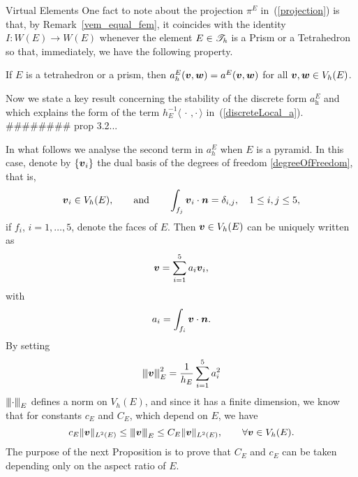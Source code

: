 \begin{chapter}{Virtual Elements}
One fact to note
about the projection $\pi^E$ in~(\ref{projection}) is that, by
Remark~\ref{vem_equal_fem},
it coincides with the identity $I:W(E)\to W(E)$ whenever the element $E\in\mathcal{T}_{\textit{h}}$
is a Prism or a Tetrahedron so that, immediately, we have the following
property.
\begin{remark}\label{ah_equal_a} If $E$ is a tetrahedron or a prism, then
  $a_h^E(\boldsymbol{v},\boldsymbol{w})=a^E(\boldsymbol{v},\boldsymbol{w})$ for all $\boldsymbol{v},\boldsymbol{w} \in V_h(E)$.
\end{remark}
Now we state a key result concerning the stability of the
discrete form $a^E_{\textit{h}}$ and which explains the form of the
term $h_E^{-1}\langle\,\cdot\,,\cdot\,\rangle$ in~(\ref{discreteLocal_a}).
\\{\color{blue}\#\#\#\#\#\#\#\# prop 3.2...}

In what follows we analyse the second term in $a_h^E$ when $E$ is a pyramid.
In this case, denote by $\{\boldsymbol{v}_i\}$ the dual basis of the degrees of freedom \eqref{degreeOfFreedom}, that is,
\[
\boldsymbol{v}_i\in V_h(E), \qquad \mbox{and}\qquad \int_{f_j}\boldsymbol{v}_i\cdot\boldsymbol{n} =\delta_{i,j}, \quad 1\le i,j\le 5,
\]
if $f_i$, $i=1,\ldots,5$, denote the faces of $E$. Then $\boldsymbol{v}\in V_h(E)$ can be uniquely written as
\[
\boldsymbol{v}=\sum_{i=1}^5 a_i \boldsymbol{v}_i,
\]
with
\[
a_i=\int_{f_i}\boldsymbol{v}\cdot\boldsymbol{n}.
\]
By setting
\[
{\left\vert\kern-0.25ex\left\vert\kern-0.25ex\left\vert \boldsymbol{v} \right\vert\kern-0.25ex\right\vert\kern-0.25ex\right\vert}_E^2=\frac1{h_E}\sum_{i=1}^5 a_i^2
\]
${\left\vert\kern-0.25ex\left\vert\kern-0.25ex\left\vert \cdot \right\vert\kern-0.25ex\right\vert\kern-0.25ex\right\vert}_E$ defines a norm on $V_h(E)$, and since it has a finite dimension, we know that for constants $c_E$ and $C_E$, which depend on $E$, we have
\begin{equation}\label{equiv0}
c_E\|\boldsymbol{v}\|_{L^2(E)}\le {\left\vert\kern-0.25ex\left\vert\kern-0.25ex\left\vert \boldsymbol{v}\right\vert\kern-0.25ex\right\vert\kern-0.25ex\right\vert}_E\le C_E\|\boldsymbol{v}\|_{L^2(E)}, \qquad \forall \boldsymbol{v}\in V_h(E).
\end{equation}
The purpose of the next Proposition is to prove that $C_E$ and $c_E$ can be taken depending only on the aspect ratio of $E$.




\end{chapter}
